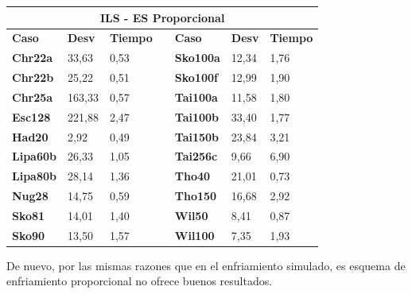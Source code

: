 \documentclass[a4paper, 12pt]{article}
\begin{document}
\begin{table}[H]
\centering
\begin{tabular}{|l|l|l|l|l|l|l|}
\hline
\multicolumn{7}{|c|}{\textbf{ILS - ES Proporcional}}                                                                \\ \hline
\textbf{Caso}    & \textbf{Desv} & \textbf{Tiempo} & \textbf{} & \textbf{Caso}    & \textbf{Desv} & \textbf{Tiempo} \\ \cline{1-3} \cline{5-7} 
\textbf{Chr22a}  & 33,63         & 0,53            &           & \textbf{Sko100a} & 12,34         & 1,76            \\ \cline{1-3} \cline{5-7} 
\textbf{Chr22b}  & 25,22         & 0,51            &           & \textbf{Sko100f} & 12,99         & 1,90            \\ \cline{1-3} \cline{5-7} 
\textbf{Chr25a}  & 163,33        & 0,57            &           & \textbf{Tai100a} & 11,58         & 1,80            \\ \cline{1-3} \cline{5-7} 
\textbf{Esc128}  & 221,88        & 2,47            &           & \textbf{Tai100b} & 33,40         & 1,77            \\ \cline{1-3} \cline{5-7} 
\textbf{Had20}   & 2,92          & 0,49            &           & \textbf{Tai150b} & 23,84         & 3,21            \\ \cline{1-3} \cline{5-7} 
\textbf{Lipa60b} & 26,33         & 1,05            &           & \textbf{Tai256c} & 9,66          & 6,90            \\ \cline{1-3} \cline{5-7} 
\textbf{Lipa80b} & 28,14         & 1,36            &           & \textbf{Tho40}   & 21,01         & 0,73            \\ \cline{1-3} \cline{5-7} 
\textbf{Nug28}   & 14,75         & 0,59            &           & \textbf{Tho150}  & 16,68         & 2,92            \\ \cline{1-3} \cline{5-7} 
\textbf{Sko81}   & 14,01         & 1,40            &           & \textbf{Wil50}   & 8,41          & 0,87            \\ \cline{1-3} \cline{5-7} 
\textbf{Sko90}   & 13,50         & 1,57            &           & \textbf{Wil100}  & 7,35          & 1,93            \\ \cline{1-3} \cline{5-7} 
\end{tabular}
\end{table}

	De nuevo, por las mismas razones que en el enfriamiento simulado, es esquema de enfriamiento proporcional no ofrece buenos resultados.
\end{document}
